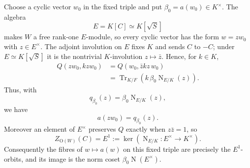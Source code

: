 \documentclass[11pt,oneside,notitlepage]{book}
\numberwithin{equation}{section}
\theoremstyle{plain}
\theoremstyle{definition}
\newcommand{\Ort}{\mathrm{O}}
\newcommand{\Tr}{\operatorname{Tr}}
\newcommand{\N}{\operatorname{N}}
\begin{document}
Choose a cyclic vector $w_0$ in the fixed triple and put $\beta_0=a(w_0)\in K^\times$. The algebra
\[
E=K[C]\simeq K[\sqrt S]
\]
makes $W$ a free rank-one $E$-module, so every cyclic vector has the form $w=zw_0$ with $z\in E^\times$. The adjoint involution on $E$ fixes $K$ and sends $C$ to $-C$; under $E\simeq K[\sqrt S]$ it is the nontrivial $K$-involution $z\mapsto\bar z$. Hence, for $k\in K$,
\[
\begin{aligned}
	Q(zw_0,kzw_0)
	&=Q(w_0,\bar z k z\,w_0)\\
	&=\Tr_{K/F}\!\left(k\,\beta_0\N_{E/K}(z)\right).
\end{aligned}
\]
Thus, with
\[
q_{\beta_0}(z)=\beta_0\N_{E/K}(z),
\]
we have
\[
a(zw_0)=q_{\beta_0}(z).
\]
Moreover an element of $E^\times$ preserves $Q$ exactly when $z\bar z=1$, so
\[
Z_{\Ort(W)}(C)=E^1:=\ker\!\left(\N_{E/K}:E^\times\to K^\times\right).
\]
Consequently the fibres of $w\mapsto a(w)$ on this fixed triple are precisely the $E^1$-orbits, and its image is the norm coset $\beta_0\N(E^\times)$. 
\end{document}
